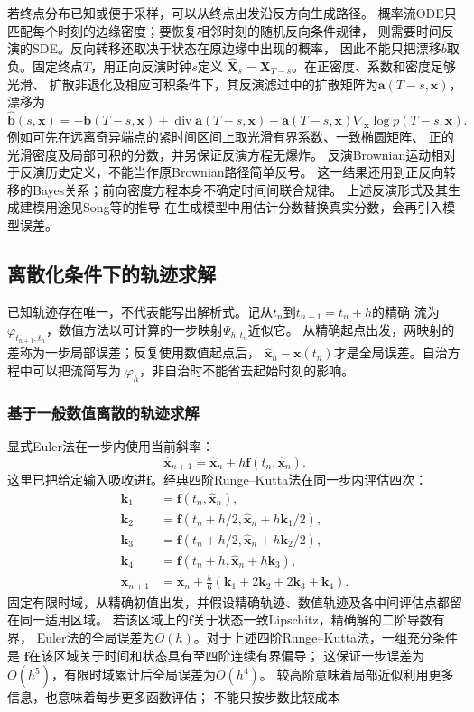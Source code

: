 若终点分布已知或便于采样，可以从终点出发沿反方向生成路径。
概率流ODE只匹配每个时刻的边缘密度；要恢复相邻时刻的随机反向条件规律，
则需要时间反演的SDE。反向转移还取决于状态在原边缘中出现的概率，
因此不能只把漂移$b$取负。固定终点$T$，用正向反演时钟$s$定义
$\widehat{\bm X}_s=\bm X_{T-s}$。在正密度、系数和密度足够光滑、
扩散非退化及相应可积条件下，其反演滤过中的扩散矩阵为$\bm a(T-s,\bm x)$，
漂移为
\[
 \widehat{\bm b}(s,\bm x)
    =-\bm b(T-s,\bm x)+\operatorname{div}\bm a(T-s,\bm x)
                  +\bm a(T-s,\bm x)\nabla_{\bm x}\log p(T-s,\bm x).
\]
例如可先在远离奇异端点的紧时间区间上取光滑有界系数、一致椭圆矩阵、
正的光滑密度及局部可积的分数，并另保证反演方程无爆炸。
反演Brownian运动相对于反演历史定义，不能当作原Brownian路径简单反号。
这一结果还用到正反向转移的Bayes关系；前向密度方程本身不确定时间间联合规律。
上述反演形式及其生成建模用途见Song等的推导
在生成模型中用估计分数替换真实分数，会再引入模型误差。

\subsection{离散化条件下的轨迹求解}
\label{sec:dynamical-discretization-scan}

已知轨迹存在唯一，不代表能写出解析式。记从$t_n$到$t_{n+1}=t_n+h$的精确
流为$\varphi_{t_{n+1},t_n}$，数值方法以可计算的一步映射$\Psi_{h,t_n}$近似它。
从精确起点出发，两映射的差称为一步局部误差；反复使用数值起点后，
$\widehat{\bm x}_n-\bm x(t_n)$才是全局误差。自治方程中可以把流简写为
$\varphi_h$，非自治时不能省去起始时刻的影响。

\subsubsection{基于一般数值离散的轨迹求解}
显式Euler法在一步内使用当前斜率：
\begin{equation}
  \widehat{\bm x}_{n+1}
  =\widehat{\bm x}_n+h\bm f(t_n,\widehat{\bm x}_n).
  \label{eq:dynamical-forward-euler}
\end{equation}
这里已把给定输入吸收进$\bm f$。经典四阶Runge--Kutta法在同一步内评估四次：
\begin{align*}
  \bm k_1&=\bm f(t_n,\widehat{\bm x}_n),\\
  \bm k_2&=\bm f(t_n+h/2,\widehat{\bm x}_n+h\bm k_1/2),\\
  \bm k_3&=\bm f(t_n+h/2,\widehat{\bm x}_n+h\bm k_2/2),\\
  \bm k_4&=\bm f(t_n+h,\widehat{\bm x}_n+h\bm k_3),\\
  \widehat{\bm x}_{n+1}
    &=\widehat{\bm x}_n+\frac h6(\bm k_1+2\bm k_2+2\bm k_3+\bm k_4).
\end{align*}
固定有限时域，从精确初值出发，并假设精确轨迹、数值轨迹及各中间评估点都留在同一适用区域。
若该区域上的$\bm f$关于状态一致Lipschitz，精确解的二阶导数有界，
Euler法的全局误差为$O(h)$。对于上述四阶Runge--Kutta法，一组充分条件是
$\bm f$在该区域关于时间和状态具有至四阶连续有界偏导；
这保证一步误差为$O(h^5)$，有限时域累计后全局误差为$O(h^4)$。
较高阶意味着局部近似利用更多信息，也意味着每步更多函数评估；
不能只按步数比较成本

